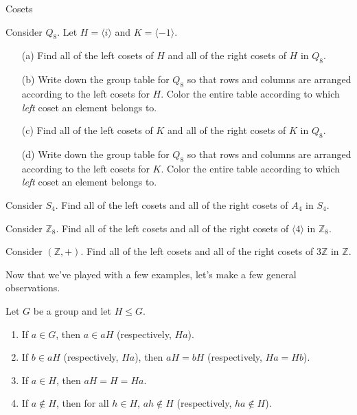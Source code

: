\begin{section}{Cosets}
\begin{exercise}\label{exer:normal_in_Q8}
Consider $Q_8$.  Let $H=\langle i\rangle$ and $K=\langle -1\rangle$.
\begin{enumerate}
\item[(a)] Find all of the left cosets of $H$ and all of the right cosets of $H$ in $Q_8$.  
\item[(b)] Write down the group table for $Q_8$ so that rows and columns are arranged according to the left cosets for $H$.  Color the entire table according to which \emph{left} coset an element belongs to.
\item[(c)] Find all of the left cosets of $K$ and all of the right cosets of $K$ in $Q_8$.
\item[(d)] Write down the group table for $Q_8$ so that rows and columns are arranged according to the left cosets for $K$.  Color the entire table according to which \emph{left} coset an element belongs to.
\end{enumerate}
\end{exercise}

\begin{exercise}
Consider $S_4$.  Find all of the left cosets and all of the right cosets of $A_4$ in $S_4$.
\end{exercise}

\begin{exercise}
Consider $\mathbb{Z}_8$.  Find all of the left cosets and all of the right cosets of $\langle 4\rangle$ in $\mathbb{Z}_8$.
\end{exercise}

\begin{exercise}
Consider $(\mathbb{Z},+)$.  Find all of the left cosets and all of the right cosets of $3\mathbb{Z}$ in $\mathbb{Z}$.
\end{exercise}

Now that we've played with a few examples, let's make a few general observations.

\begin{theorem}\label{thm:coset_representative}
Let $G$ be a group and let $H\leq G$.
\begin{enumerate}
\item If $a\in G$, then $a\in aH$ (respectively, $Ha$).
\item If $b\in aH$ (respectively, $Ha$), then $aH=bH$ (respectively, $Ha=Hb$).
\item If $a\in H$, then $aH=H=Ha$.
\item If $a\notin H$, then for all $h\in H$, $ah\notin H$ (respectively, $ha \notin H$).
\end{enumerate}
\end{theorem}


\end{section}
